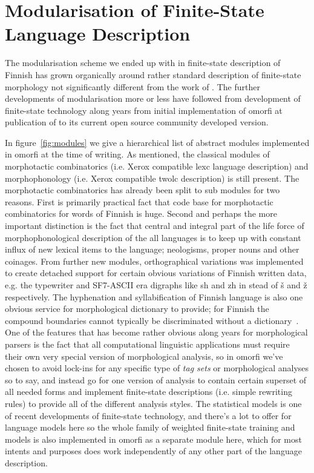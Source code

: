 \documentclass[11pt]{article}
\begin{document}
\section{Modularisation of Finite-State Language Description}
\label{sec:modules}

The modularisation scheme we ended up with in finite-state description of
Finnish has grown organically around rather standard description of
finite-state morphology not significantly different from the work of
. The further developments of modularisation more or
less have followed from development of finite-state technology along years
from initial implementation of omorfi at publication of 
to its current open source community developed version.

In figure~\ref{fig:modules} we give a hierarchical list of abstract
modules implemented in omorfi at the time of writing. As mentioned, the
classical modules of morphotactic combinatorics (i.e. Xerox compatible lexc
language description) and morphophonology (i.e. Xerox compatible twolc
description) is still present. The morphotactic combinatorics has already been
split to sub modules for two reasons. First is primarily practical fact
that code base for morphotactic combinatorics for words of Finnish is huge.
Second and perhaps the more important distinction is the fact that central
and integral part of the life force of morphophonological description of
the all languages is to keep up with constant influx of new lexical items
to the language; neologisms, proper nouns and other coinages.  From further
new modules, orthographical variations was implemented to create detached
support for certain obvious variations of Finnish written data, e.g. the
typewriter and SF7-ASCII era digraphs like sh and zh in stead of š and ž
respectively. The hyphenation and syllabification of Finnish language is also
one obvious service for morphological dictionary to provide; for Finnish the
compound boundaries cannot typically be discriminated without a
dictionary~\cite{linden/2009/nodalida}.  One of the features that has become
rather obvious along years for morphological parsers is the fact that all
computational linguistic applications must require their own very special
version of morphological analysis, so in omorfi we've chosen to avoid lock-ins
for any specific type of \emph{tag sets} or morphological analyses so to say,
and instead go for one version of analysis to contain certain superset of all
needed forms and implement finite-state descriptions (i.e. simple rewriting
rules) to provide all of the different analysis styles. The statistical models
is one of recent developments of finite-state technology, and there's a lot
to offer for language models here so the whole family of weighted finite-state
training and models is also implemented in omorfi as a separate module here,
which for most intents and purposes does work independently of any other part
of the language description.
\end{document}
